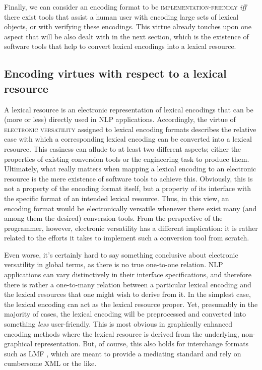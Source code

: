 \documentclass[output=paper]{langsci/langscibook}
\begin{document}
Finally, we can consider an encoding format to be \textsc{implementation-friendly} \textit{iff} the\-re exist tools that assist a human user with encoding large sets of lexical objects, or with verifying these encodings. This virtue already touches upon one aspect that will be also dealt with in the next section, which is the existence of software tools that help to convert lexical encodings into a lexical resource. 

\subsection{Encoding virtues with respect to a lexical resource}
\label{lic:sec:virtues-resource}

  A lexical resource is an electronic representation of lexical encodings that can be (more or less) directly used in NLP applications. Accordingly, the virtue of \textsc{electronic versatility} assigned to lexical encoding formats describes the relative ease with which a corresponding lexical encoding can be converted into a lexical resource. This easiness can allude to at least two different aspects; either the properties of existing conversion tools or the engineering task to produce them. Ultimately, what really matters when mapping a lexical encoding to an electronic resource is the mere existence of software tools to achieve this. Obviously, this is not a property of the encoding format itself, but a property of its interface with the specific format of an intended lexical resource. Thus, in this view, an encoding format would be electronically versatile whenever there exist many (and among them the desired) conversion tools. From the perspective of the programmer, however, electronic versatility has a different implication: it is rather related to the efforts it takes to implement such a conversion tool from scratch.

  Even worse, it's certainly hard to say something conclusive about electronic versatility in global terms, as there is no true one-to-one relation. NLP applications can vary distinctively in their interface specifications, and therefore there is rather a one-to-many relation between a particular lexical encoding and the lexical resources that one might wish to derive from it. In the simplest case, the lexical encoding can act as the lexical resource proper. Yet, presumably in the majority of cases, the lexical encoding will be preprocessed and converted into something \textit{less} user-friendly. This is most obvious in graphically enhanced encoding methods where the lexical resource is derived from the underlying, non-graphical representation. But, of course, this also holds for interchange formats such as LMF \citep{francopoulo:etal:06}, which are meant to provide a mediating standard and rely on cumbersome XML or the like. 
\end{document}
